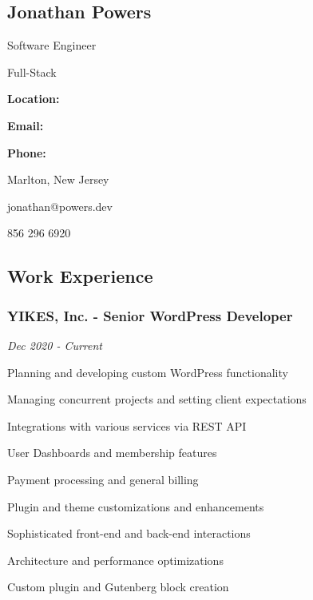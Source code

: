 \documentclass{article}
\newenvironment{narrow_list}{
	\begin{itemize}
		\setlength{\itemsep}{0pt}
		\setlength{\parskip}{-1pt}
		\setlength{\parsep}{0pt}
	}{\end{itemize}
}
\begin{document}

	\begin{multicols}{2}

		\section*{Jonathan Powers}

		Software Engineer

		Full-Stack

	\columnbreak

		\vspace{3mm}

		\setlength{\columnsep}{-4cm}

		\begin{multicols}{2}

			\textbf{Location:} 

			\textbf{Email:} 

			\textbf{Phone:} 

		\columnbreak

			Marlton, New Jersey

			jonathan@powers.dev

			856 296 6920
		
		\end{multicols}

		\vspace{3mm}

	\end{multicols}



	\subsection*{Work Experience}


	\vspace{2mm}

	\subsubsection*{YIKES, Inc. - Senior WordPress Developer}

	\vspace{-1.5mm}

	\textit{Dec 2020 - Current}

	Planning and developing custom WordPress functionality

	\begin{narrow_list}
		\item Managing concurrent projects and setting client expectations
		\item Integrations with various services via REST API
		\item User Dashboards and membership features
		\item Payment processing and general billing
		\item Plugin and theme customizations and enhancements
		\item Sophisticated front-end and back-end interactions
		\item Architecture and performance optimizations
		\item Custom plugin and Gutenberg block creation
	\end{narrow_list}
\end{document}
